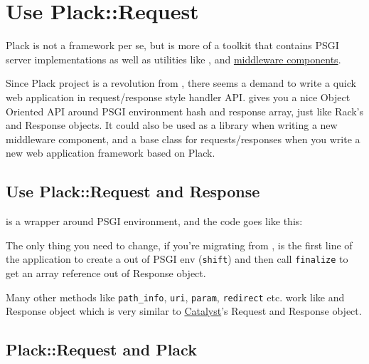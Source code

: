 \chapter{Use Plack::Request}\label{day-14-use-plackrequest}

Plack is not a framework per se, but is more of a toolkit that contains
PSGI server implementations as well as utilities like
\href{http://advent.plackperl.org/2009/12/day-3-using-plackup.html}{},
\href{http://advent.plackperl.org/2009/12/day-13-use-placktest-to-test-your-application.html}{}
and
\href{http://advent.plackperl.org/2009/12/day-10-using-plack-middleware.html}{middleware
components}.

Since Plack project is a revolution from
\href{http://search.cpan.org/perldoc?HTTP::Engine}{}, there
seems a demand to write a quick web application in request/response
style handler API.  gives you a nice Object Oriented API
around PSGI environment hash and response array, just like Rack's
 and Response objects. It could also be used as a library
when writing a new middleware component, and a base class for
requests/responses when you write a new web application framework based
on Plack.

\section{Use Plack::Request and
Response}\label{use-plackrequest-and-response}

 is a wrapper around PSGI environment, and the code goes
like this:


The only thing you need to change, if you're migrating from
, is the first line of the application to create a
 out of PSGI env (\lstinline!shift!) and then call
\lstinline!finalize! to get an array reference out of Response object.

Many other methods like \lstinline!path_info!, \lstinline!uri!,
\lstinline!param!, \lstinline!redirect! etc. work like
 and Response object which is very similar to
\href{http://search.cpan.org/dist/Catalyst-Runtime}{Catalyst}'s Request
and Response object.

\section{Plack::Request and Plack}\label{plackrequest-and-plack}

